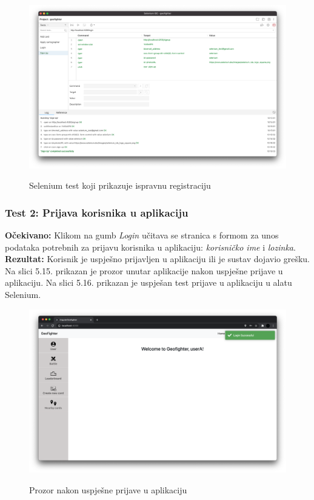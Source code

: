 			\begin{figure}[H]
				\centering
				\includegraphics[scale=0.27]{slike/SeleniumRegistrationTest.png} \\
				\caption{ Selenium test koji prikazuje ispravnu registraciju}
				\label{fig:SeleniumRegistrationTest}
			\end{figure}

			\subsubsection{Test 2: Prijava korisnika u aplikaciju}
			\textbf{Očekivano: } Klikom na gumb \textit{Login} učitava se stranica s formom za unos podataka potrebnih za prijavu korisnika u aplikaciju: \textit{korisničko ime} i \textit{lozinka}.\\
			\textbf{Rezultat: } Korisnik  je  uspješno  prijavljen u aplikaciju ili  je  sustav  dojavio grešku.\\

			    Na slici 5.15. prikazan je prozor unutar aplikacije nakon uspješne prijave u aplikaciju. Na slici 5.16. prikazan je uspješan test prijave u aplikaciju u alatu Selenium.

			\begin{figure}[H]
				\centering
				\includegraphics[scale=0.27]{slike/SeleniumLoginSuccess.png} \\
				\caption{ Prozor nakon uspješne prijave u aplikaciju}
				\label{fig:SeleniumLoginSuccess}
			\end{figure}

